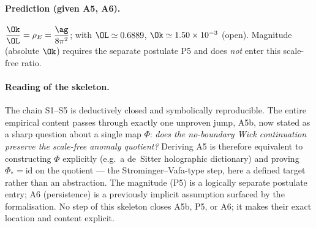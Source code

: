 \paragraph{Prediction (given A5, A6).}
\begin{description}[nosep,leftmargin=3.4em]
\item[\textnormal{S7} {[DER\,$|$\,A5,A6]}]
  $\displaystyle \frac{\Ok}{\OL}=\rho_E=\frac{\ag}{8\pi^2}$;
  with $\OL\simeq0.6889$, $\Ok\simeq1.50\times10^{-3}$ (open).
  Magnitude (absolute $\Ok$) requires the separate postulate P5 and does
  \emph{not} enter this scale-free ratio.
\end{description}

\paragraph{Reading of the skeleton.}
The chain S1--S5 is deductively closed and symbolically reproducible. The
entire empirical content passes through exactly one unproven jump, A5b,
now stated as a sharp question about a single map $\Phi$: \emph{does the
no-boundary Wick continuation preserve the scale-free anomaly quotient?}
Deriving A5 is therefore equivalent to constructing $\Phi$ explicitly (e.g.\
a de~Sitter holographic dictionary) and proving $\Phi_*=\mathrm{id}$ on the
quotient --- the Strominger--Vafa-type step, here a defined target rather
than an abstraction. The magnitude (P5) is a logically separate postulate
entry; A6 (persistence) is a previously implicit assumption surfaced by the
formalisation. No step of this skeleton closes A5b, P5, or A6; it makes
their exact location and content explicit.
